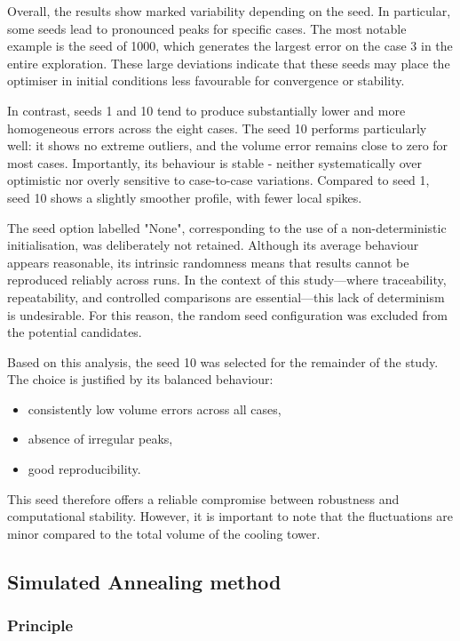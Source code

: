 Overall, the results show marked variability depending on the seed. In particular, some seeds lead to pronounced peaks for specific cases. The most notable example is the seed of 1000, which generates the largest error on the case 3 in the entire exploration. These large deviations indicate that these seeds may place the optimiser in initial conditions less favourable for convergence or stability.

In contrast, seeds 1 and 10 tend to produce substantially lower and more homogeneous errors across the eight cases. The seed 10 performs particularly well: it shows no extreme outliers, and the volume error remains close to zero for most cases. Importantly, its behaviour is stable - neither systematically over optimistic nor overly sensitive to case-to-case variations. Compared to seed 1, seed 10 shows a slightly smoother profile, with fewer local spikes.

The seed option labelled "None", corresponding to the use of a non-deterministic initialisation, was deliberately not retained. Although its average behaviour appears reasonable, its intrinsic randomness means that results cannot be reproduced reliably across runs. In the context of this study---where traceability, repeatability, and controlled comparisons are essential---this lack of determinism is undesirable. For this reason, the random seed configuration was excluded from the potential candidates.

Based on this analysis, the seed 10 was selected for the remainder of the study. The choice is justified by its balanced behaviour:
\begin{itemize}
    \item consistently low volume errors across all cases,
    \item absence of irregular peaks,
    \item good reproducibility.
\end{itemize}
This seed therefore offers a reliable compromise between robustness and computational stability. However, it is important to note that the fluctuations are minor compared to the total volume of the cooling tower.

\subsection{Simulated Annealing method}

\subsubsection{Principle}

